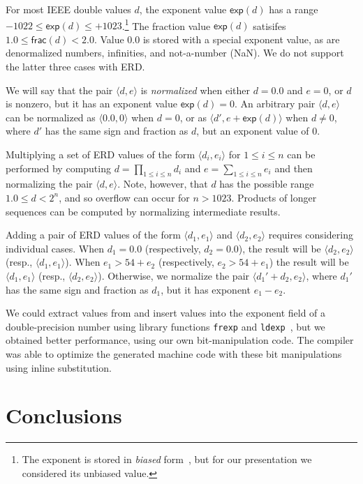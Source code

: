 \documentclass{easychair}
\newcommand{\fexp}{\textsf{exp}}
\newcommand{\ffrac}{\textsf{frac}}
\begin{document}
  For most IEEE double values $d$, the exponent value $\fexp(d)$
  has a range $-1022 \leq \fexp(d) \leq +1023$.\footnote{The exponent is stored in \emph{biased} form~\cite{overton:siam:2001},
  but for our presentation we considered its unbiased value.}
  The fraction value
  $\fexp(d)$ satisifes $1.0 \leq \ffrac(d) < 2.0$.
  Value $0.0$ is stored with a
  special exponent value, as are denormalized numbers, infinities,
  and not-a-number (NaN).  We do not support the latter three cases
  with ERD\@.

  We will say that the pair $\langle d, e \rangle$ is
  \emph{normalized} when either $d = 0.0$ and $e = 0$, or $d$ is
  nonzero, but it has an exponent value $\fexp(d) = 0$.  An arbitrary
  pair $\langle d, e \rangle$ can be normalized as $\langle 0.0, 0 \rangle$
  when $d = 0$, or as $\langle d', e + \fexp(d)\rangle$ when
  $d \not = 0$, where $d'$ has the same sign and fraction as $d$, but
  an exponent value of $0$.

  Multiplying a set of ERD values of the form
$\langle d_i, e_i \rangle$ for $1 \leq i \leq n$
  can be performed by computing $d = \prod_{1\leq i \leq n} d_i$
  and $e = \sum_{1 \leq i \leq n} e_i$ and then normalizing
  the pair $\langle d, e \rangle$.  Note, however, that $d$
  has the possible range $1.0 \leq d < 2^n$, and so overflow can occur for $n > 1023$.
  Products of longer sequences can be computed by normalizing intermediate results.
  
  Adding a pair of ERD values of the form $\langle d_1, e_1 \rangle$
  and $\langle d_2, e_2 \rangle$ requires considering individual
  cases.  When $d_1 = 0.0$ (respectively, $d_2 = 0.0$),
  the result will be
  $\langle d_2, e_2 \rangle$ (resp., $\langle d_1, e_1\rangle$).
  When $e_1 > 54 + e_2$ (respectively, $e_2 > 54 + e_1$)
  the result will be $\langle d_1, e_1 \rangle$
  (resp., $\langle d_2, e_2 \rangle$).
  Otherwise, we
  normalize the pair $\langle d_1' + d_2, e_2 \rangle$, where $d_1'$
  has the same sign and fraction as $d_1$, but it has exponent
  $e_1 - e_2$.

  We could extract values from and insert values into the exponent
  field of a double-precision number using library functions
  \texttt{frexp} and \texttt{ldexp}~\cite{jones:1991}, but we obtained better
  performance, using our own bit-manipulation code.  The
  compiler was able to optimize the generated machine code with these bit manipulations
  using inline substitution.

\section{Conclusions}
\label{sect:conclusion}
\end{document}
